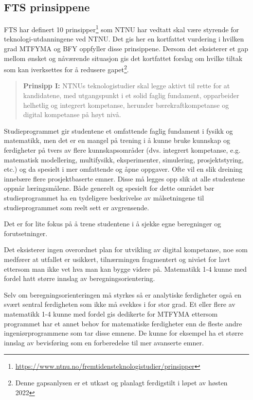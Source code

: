 \subsection{FTS prinsippene}
\label{sec:fts-principles}
FTS har definert 10 prinsipper\footnote{\url{https://www.ntnu.no/fremtidensteknologistudier/prinsipper}} som NTNU har vedtatt skal være styrende for teknologi-utdanningene ved NTNU. Det gis her en kortfattet vurdering i hvilken grad MTFYMA og BFY oppfyller disse prinsippene. Dersom det eksisterer et gap mellom ønsket og nåværende situasjon gis det kortfattet forslag om hvilke tiltak som kan iverksettes for å redusere gapet\footnote{Denne gapsanlysen er et utkast og planlagt ferdigstilt i løpet av høsten 2022}.

\begin{quote}
	\textbf{Prinsipp I:} NTNUs teknologistudier skal legge aktivt til rette for at kandidatene, med utgangspunkt i et solid faglig fundament, opparbeider helhetlig og integrert kompetanse, herunder bærekraftkompetanse og digital kompetanse på høyt nivå.
\end{quote}

Studieprogrammet gir studentene et omfattende faglig fundament i fysikk og matematikk, men det er en mangel på trening i å kunne bruke kunnskap og ferdigheter på tvers av flere kunnskapsområder (dvs. integrert kompetanse, e.g. matematisk modellering, multifysikk, eksperimenter, simulering, prosjektstyring, etc.) og da spesielt i mer omfattende og åpne oppgaver. Ofte vil en slik dreining innebære flere prosjektbaserte emner. Disse må legges opp slik at alle studentene oppnår læringsmålene. Både generelt og spesielt for dette området bør studieprogrammet ha en tydeligere beskrivelse av målsetningene til studieprogrammet som reelt sett er avgrensende. 

Det er for lite fokus på å trene studentene i å sjekke egne beregninger og forutsetninger.

Det eksisterer ingen overordnet plan for utvikling av digital kompetanse, noe som medfører at utfallet er usikkert, tilnærmingen fragmentert og nivået for lavt ettersom man ikke vet hva man kan bygge videre på. Matematikk 1-4 kunne med fordel hatt større innslag av beregningsorientering.

Selv om beregningsorienteringen må styrkes så er analytiske ferdigheter også en svært sentral ferdigheten som ikke må svekkes i for stor grad. Et eller flere av matematikk 1-4 kunne med fordel gis dedikerte for MTFYMA ettersom programmet har et annet behov for matematiske ferdigheter enn de fleste andre ingeniørprogrammene som tar disse emnene. De kunne for eksempel ha et større innslag av bevisføring som en forberedelse til mer avanserte emner.

